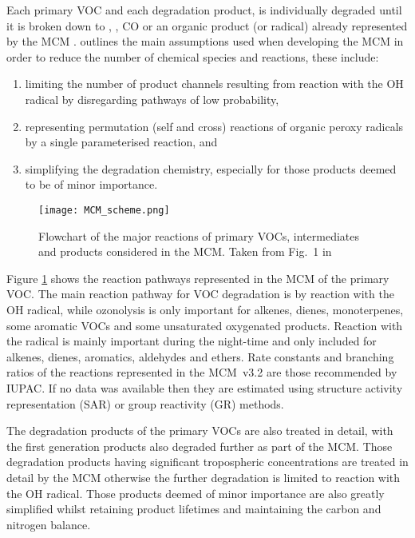 Each primary VOC and each degradation product, is individually degraded until it is broken down to , , CO or an organic product (or radical) already represented by the MCM \citep{Jenkin:1997}. 
\citet{Jenkin:1997} outlines the main assumptions used when developing the MCM in order to reduce the number of chemical species and reactions, these include:
\begin{enumerate}
    \item limiting the number of product channels resulting from reaction with the OH radical by disregarding pathways of low probability,
    \item representing permutation (self and cross) reactions of organic peroxy radicals by a single parameterised reaction, and
    \item simplifying the degradation chemistry, especially for those products deemed to be of minor importance.
\end{enumerate}

\begin{figure}
    \begin{center}
        \caption[Flowchart of VOC degradation represented by the MCM]{Flowchart of the major reactions of primary VOCs, intermediates and products considered in the MCM. Taken from Fig.~1 in \citet{Saunders:2003}}
        \texttt{[image: MCM\_scheme.png]}
        \label{f:MCM_scheme}
    \end{center}
\end{figure} 

Figure \ref{f:MCM_scheme} shows the reaction pathways represented in the MCM of the primary VOC.
The main reaction pathway for VOC degradation is by reaction with the OH radical, while ozonolysis is only important for alkenes, dienes, monoterpenes, some aromatic VOCs and some unsaturated oxygenated products. 
Reaction with the  radical is mainly important during the night-time and only included for alkenes, dienes, aromatics, aldehydes and ethers.
Rate constants and branching ratios of the reactions represented in the MCM~v3.2 are those recommended by IUPAC.
If no data was available then they are estimated using structure activity representation (SAR) or group reactivity (GR) methods.

The degradation products of the primary VOCs are also treated in detail, with the first generation products also degraded further as part of the MCM. 
Those degradation products having significant tropospheric concentrations are treated in detail by the MCM otherwise the further degradation is limited to reaction with the OH radical. 
Those products deemed of minor importance are also greatly simplified whilst retaining product lifetimes and maintaining the carbon and nitrogen balance. 

